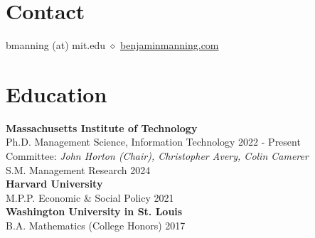 \documentclass[margin,line,pifont,palatino,courier, 9pt]{res}
\begin{document}
\begin{resume}


\normalsize


\section{\sc Contact}
bmanning (at) mit.edu $\diamond$ \href{https://benjaminmanning.com/}{benjaminmanning.com}

\section{\sc Education}
{\bf Massachusetts Institute of Technology}\\
Ph.D. Management Science, Information Technology \hfill 2022 - Present\\
\hspace*{1.5em}Committee: \emph{John Horton (Chair), Christopher Avery, Colin Camerer}\\
S.M. Management Research \hfill 2024\vspace{2mm}\\
{\bf Harvard University}\\
M.P.P. Economic \& Social Policy \hfill 2021\vspace{2mm}\\
{\bf Washington University in St. Louis}\\
B.A. Mathematics (College Honors) \hfill 2017



\end{resume}
\end{document}
